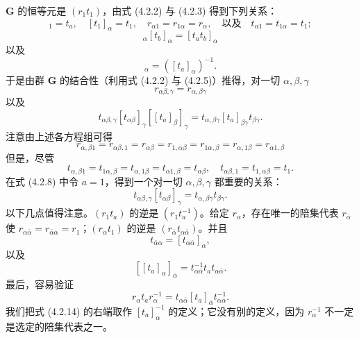 $\mathbf{G}$ 的恒等元是 $(r_{1}t_{1})$，由式 (4.2.2) 与 (4.2.3) 得到下列关系：
\begin{equation*}
[t_{a}]_{1} = t_{a}, \quad [t_{1}]_{\alpha} = t_{1}, \quad r_{\alpha 1} = r_{1\alpha} = r_{\alpha}, \quad\text{以及}\quad t_{\alpha 1} = t_{1\alpha} = t_{1};
\tag{4.2.4}
\end{equation*}
\begin{equation*}
[t_{a}]_{\alpha}[t_{b}]_{\alpha} = [t_{a}t_{b}]_{\alpha}
\tag{4.2.5}
\end{equation*}
以及
\begin{equation*}
[t^{-1}_{a}]_{\alpha} = \left([t_{a}]_{\alpha}\right)^{-1}.
\tag{4.2.6}
\end{equation*}
于是由群 $\mathbf{G}$ 的结合性（利用式 (4.2.2) 与 (4.2.5)）推得，对一切 $\alpha, \beta, \gamma$
\begin{equation*}
r_{\alpha\beta, \gamma} = r_{\alpha, \beta\gamma}
\tag{4.2.7}
\end{equation*}
以及
\begin{equation*}
t_{\alpha\beta, \gamma}[t_{\alpha\beta}]_{\gamma}[[t_{a}]_{\beta}]_{\gamma} = t_{\alpha, \beta\gamma}[t_{a}]_{\beta\gamma}t_{\beta\gamma}.
\tag{4.2.8}
\end{equation*}
注意由上述各方程组可得
\begin{equation*}
r_{\alpha, \beta 1} = r_{\alpha\beta, 1} = r_{\alpha\beta} = r_{1, \alpha\beta} = r_{1\alpha, \beta} = r_{\alpha, 1\beta} = r_{\alpha 1, \beta}
\tag{4.2.9}
\end{equation*}
但是，尽管
\begin{equation*}
t_{\alpha, \beta 1} = t_{1\alpha, \beta} = t_{\alpha, 1\beta} = t_{\alpha 1, \beta} = t_{\alpha\beta}, \quad t_{\alpha\beta, 1} = t_{1, \alpha\beta} = t_{1}.
\tag{4.2.10}
\end{equation*}
在式 (4.2.8) 中令 $a = 1$，得到一个对一切 $\alpha, \beta, \gamma$ 都重要的关系：
\begin{equation*}
t_{\alpha\beta, \gamma}[t_{\alpha\beta}]_{\gamma} = t_{\alpha, \beta\gamma}t_{\beta\gamma}.
\tag{4.2.11}
\end{equation*}
以下几点值得注意。$(r_{1}t_{a})$ 的逆是 $(r_{1}t^{-1}_{a})$。给定 $r_{\alpha}$，存在唯一的陪集代表 $r_{\bar{\alpha}}$ 使 $r_{\alpha\bar{\alpha}} = r_{\bar{\alpha}\alpha} = r_{1}$；$(r_{\alpha}t_{1})$ 的逆是 $(r_{\bar{\alpha}}t_{\alpha\bar{\alpha}})$。并且
\begin{equation*}
t_{\bar{\alpha}\alpha} = [t_{\alpha\bar{\alpha}}]_{\alpha},
\tag{4.2.12}
\end{equation*}
以及
\begin{equation*}
\left[[t_{a}]_{\alpha}\right]_{\bar{\alpha}} = t^{-1}_{\alpha\bar{\alpha}}t_{a}t_{\alpha\bar{\alpha}}.
\tag{4.2.13}
\end{equation*}
最后，容易验证
\begin{equation*}
r_{\alpha}t_{a}r^{-1}_{\alpha} = t_{\alpha\bar{\alpha}}[t_{a}]_{\bar{\alpha}}t^{-1}_{\alpha\bar{\alpha}}.
\tag{4.2.14}
\end{equation*}
我们把式 (4.2.14) 的右端取作 $[t_{a}]_{\alpha}^{-1}$ 的定义；它没有别的定义，因为 $r^{-1}_{\alpha}$ 不一定是选定的陪集代表之一。

